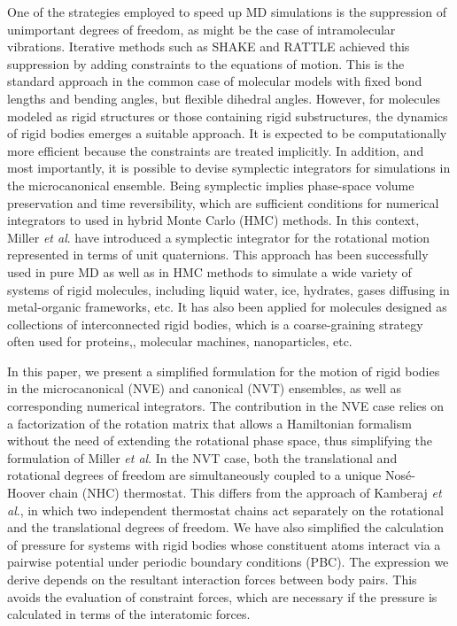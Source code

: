 \documentclass[aip,jcp,reprint,amsmath,amssymb,raggedbottom]{revtex4-1}
\begin{document}
One of the strategies employed to speed up MD simulations is the suppression of unimportant degrees of freedom, as might be the case of intramolecular vibrations. Iterative methods such as SHAKE\cite{Ryckaert1977} and RATTLE\cite{Andersen1983} achieved this suppression by adding constraints to the equations of motion. This is the standard approach in the common case of molecular models with fixed bond lengths and bending angles, but flexible dihedral angles. However, for molecules modeled as rigid structures or those containing rigid substructures,\cite{Miller2002} the dynamics of rigid bodies emerges a suitable approach. It is expected to be computationally more efficient because the constraints are treated implicitly. In addition, and most importantly, it is possible to devise symplectic integrators for simulations in the microcanonical ensemble. Being symplectic implies phase-space volume preservation and time reversibility, which are sufficient conditions for numerical integrators to used in hybrid Monte Carlo (HMC) methods.\cite{Duane1987} In this context, Miller \textit{et al}.\cite{Miller2002} have introduced a symplectic integrator for the rotational motion represented in terms of unit quaternions. This approach has been successfully used in pure MD as well as in HMC methods to simulate a wide variety of systems of rigid molecules, including liquid water,\cite{Sakamaki2011, Reinhardt2012, Palmer2014, Gonzales2014} ice,\cite{Geiger2014} hydrates,\cite{Tribello2009, Gorman2012} gases diffusing in metal-organic frameworks,\cite{Ghoufi2010} etc. It has also been applied for molecules designed as collections of interconnected rigid bodies, which is a coarse-graining strategy often used for proteins,\cite{Terada2003}, molecular machines,\cite{Akimov2008, Konyukhov2010} nanoparticles,\cite{Knorowski2012, Patra2013} etc.

In this paper, we present a simplified formulation for the motion of rigid bodies in the microcanonical (NVE) and canonical (NVT) ensembles, as well as corresponding numerical integrators. The contribution in the NVE case relies on a factorization of the rotation matrix that allows a Hamiltonian formalism without the need of extending the rotational phase space, thus simplifying the formulation of Miller \textit{et al}.\cite{Miller2002} In the NVT case, both the translational and rotational degrees of freedom are simultaneously coupled to a unique Nos\'{e}-Hoover chain (NHC) thermostat. This differs from the approach of Kamberaj \textit{et al}.,\cite{Kamberaj2005} in which two independent thermostat chains act separately on the rotational and the translational degrees of freedom. We have also simplified the calculation of pressure for systems with rigid bodies whose constituent atoms interact via a pairwise potential under periodic boundary conditions (PBC). The expression we derive depends on the resultant interaction forces between body pairs. This avoids the evaluation of constraint forces, which are necessary if the pressure is calculated in terms of the interatomic forces.
\end{document}
